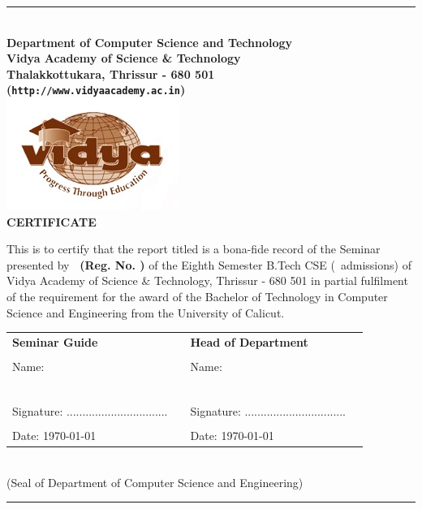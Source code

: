 %
\begin{center}
\hrule
\quad\\[0.75cm]
{\Large \bf Department of Computer Science and Technology}\\
{\large \bf Vidya Academy of Science \& Technology}\\
{\normalsize \bf Thalakkottukara, Thrissur - 680 501\\
({\tt http://www.vidyaacademy.ac.in})}\\[0.5cm]
\includegraphics{VidyaLogo}\\[1.25cm]
%
{\Large \bf CERTIFICATE}\\[1cm]
%
\end{center}
This is to certify that the report titled 
{\bf \vtitle} is a bona-fide record of the 
Seminar presented by {\bf \vauthor\  
(Reg. No. \vregisternumber)}    of the Eighth 
Semester B.Tech CSE (\vadmissionyear\ admissions) 
of Vidya Academy of Science \& Technology, 
Thrissur - 680 501 in partial fulfilment of the 
requirement for the award of the Bachelor of Technology in Computer Science and Engineering from the University of 
Calicut.\\[0.1cm]
%
\begin{center}
\begin{tabular}{llll}
\multicolumn{2}{l}{\bf Seminar Guide}    
&\multicolumn{2}{l}{\bf Head of Department}   \\
   & & \\
Name: &&  Name: \\
\vguide\ && \vhod\ \\ \\
Signature: \quad  ................................
\qquad \qquad && Signature: \quad 
................................ \\
& & & \\
Date: \hspace{10mm} \today & & Date: \hspace{10mm} \today \\
\end{tabular}
\\[1cm]
{\small (Seal of Department of Computer Science and Engineering)}
\quad \\[0.75cm]
\hrule
\end{center} 
%
\vspace*{\fill}